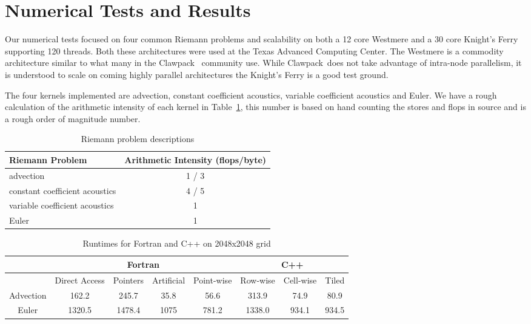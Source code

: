 \documentclass{article}
\def\clawpack{Clawpack~}
\begin{document}
\section{Numerical Tests and Results}

Our numerical tests focused on four common Riemann problems and scalability on
both a 12 core Westmere and a 30 core Knight's Ferry supporting 120 threads.
Both these architectures were used at the Texas Advanced Computing Center.  The
Westmere is a commodity architecture similar to what many in the \clawpack
community use.  While \clawpack does not take advantage of intra-node
parallelism, it is understood to scale on coming highly parallel architectures
the Knight's Ferry is a good test ground.

The four kernels implemented are advection, constant coefficient acoustics,
variable coefficient acoustics and Euler. We have a rough calculation of the
arithmetic intensity of each kernel in Table~\ref{table:rp}, this number is
based on hand counting the stores and flops in source and is a rough order of
magnitude number.

\begin{table}
        \centering
\begin{tabular}{|lc|}
\hline
Riemann Problem & Arithmetic Intensity (flops/byte) \\ \hline
advection &  1 / 3 \\
constant coefficient acoustics &  4 / 5\\
variable coefficient acoustics & 1 \\
Euler & 1 \\ \hline
\end{tabular}
\caption{Riemann problem descriptions}
\label{table:rp}
\end{table}

\begin{table}
\centering
\begin{tabular}{|c|cccc|ccc|}
\hline
& \multicolumn{4}{|c|}{Fortran} & \multicolumn{3}{|c|}{C++} \\ \hline
& Direct Access & Pointers & Artificial & Point-wise & Row-wise & Cell-wise & Tiled \\ \hline
Advection & 162.2 & 245.7 & 35.8 & 56.6 & 313.9 & 74.9 & 80.9 \\
Euler & 1320.5 & 1478.4 & 1075 & 781.2 & 1338.0 & 934.1  & 934.5 \\ \hline
\end{tabular}
\caption{Runtimes for Fortran and C++ on 2048x2048 grid}
\label{table:fortvc++}
\end{table}
\end{document}

